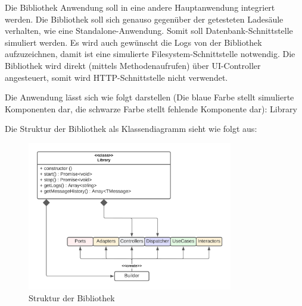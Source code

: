 Die Bibliothek Anwendung soll in eine andere Hauptanwendung integriert werden. 
Die Bibliothek soll sich genauso gegenüber der getesteten Ladesäule verhalten, wie eine Standalone-Anwendung. 
Somit soll Datenbank-Schnittstelle simuliert werden. 
Es wird auch gewünscht die Logs von der Bibliothek aufzuzeichnen, damit ist eine simulierte Filesystem-Schnittstelle notwendig.
Die Bibliothek wird direkt (mittels Methodenaufrufen) über UI-Controller angesteuert, somit wird HTTP-Schnittstelle nicht verwendet. 

Die Anwendung lässt sich wie folgt darstellen (Die blaue Farbe stellt simulierte Komponenten
dar, die schwarze Farbe stellt fehlende Komponente dar):
{Library}

\newpage
Die Struktur der Bibliothek als Klassendiagramm sieht wie folgt aus:

\begin{figure}[H]
    \centering
    \includegraphics[width=0.8\textwidth]{./images/LibraryKlassenDiagramm.png}
    \caption[Struktur der Bibliothek]{Struktur der Bibliothek}
    \label{fig:LibraryClassDiagramm}
\end{figure}